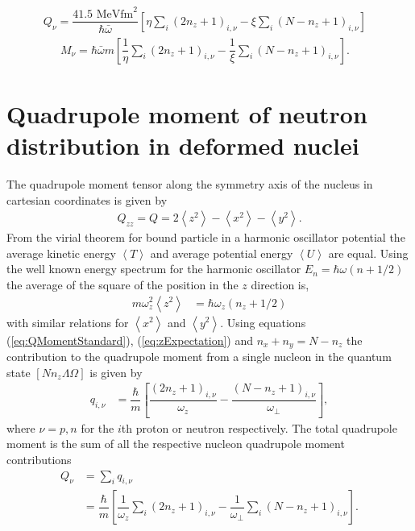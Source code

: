 \documentclass[10pt,a4paper, twoside, openright]{report}
\begin{document}
\begin{align}
Q_{\nu} = \dfrac{41.5\text{ MeV}\text{fm}^2}{\hbar\bar{\omega}}\left[\eta\sum_{i}\left(2n_z + 1\right)_{i,\nu}  - \xi\sum_{i}\left(N - n_z + 1\right)_{i,\nu}\right]&
\label{eq:QDimensionless}
\end{align}
\begin{align}
M_{\nu} = \hbar\bar{\omega}m\left[\dfrac{1}{\eta}\sum_{i}\left(2n_z + 1\right)_{i,\nu} - \dfrac{1}{\xi}\sum_{i}\left(N - n_z + 1\right)_{i,\nu}\right]. & \label{eq:MDimensionless}
\end{align}
\section{Quadrupole moment of neutron distribution in deformed nuclei}

The quadrupole moment tensor along the symmetry axis of the nucleus in cartesian coordinates is given by
\begin{align}\label{eq:QMomentStandard}
Q_{zz} = Q = 2\left<z^2\right> - \left<x^2\right> - \left<y^2\right> .
\end{align}
From the virial theorem for bound particle in a harmonic oscillator potential the average kinetic energy $\left<T\right>$ and average potential energy $\left<U\right>$ are equal. Using the well known energy spectrum for the harmonic oscillator $E_{n} = \hbar\omega(n + 1/2)$  the average of the square of the position in the $z$ direction is,
\begin{align}\label{eq:zExpectation}
m\omega_z^2\left<z^2\right>&= \hbar\omega_z\left(n_z + 1/2\right) 
\end{align}
  with similar relations for $\left<x^2\right>$ and $\left<y^2\right>$. Using equations (\ref{eq:QMomentStandard}), (\ref{eq:zExpectation}) and $n_x + n_y = N - n_z$ the contribution to the quadrupole moment from a single nucleon in the quantum state $\left[N n_z \Lambda \Omega\right]$ is given by
\begin{align} \label{eq:QMomentNucleon}
q_{i,\nu} &= \dfrac{\hbar}{m}\left[\dfrac{\left(2n_z + 1\right)_{i,\nu}}{\omega_z} - \dfrac{\left(N -n_z + 1\right)_{i,\nu}}{\omega_{\perp}}\right] ,
\end{align}
where $\nu = p,n$ for the $i$th proton or neutron respectively. The total quadrupole moment is the sum of all the respective nucleon quadrupole moment contributions
\begin{align}
Q_{\nu} &= \sum_{i} q_{i,\nu} \nonumber\\
&= \dfrac{\hbar}{m}\left[\dfrac{1}{\omega_z}\sum_{i}\left(2n_z + 1\right)_{i,\nu} - \dfrac{1}{\omega_{\perp}}\sum_{i}\left(N -n_z + 1\right)_{i,\nu}\right]. \label{eq:CollectiveMDim} 
\end{align}
\end{document}
